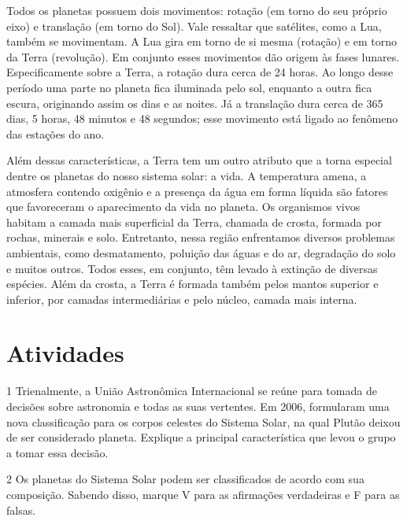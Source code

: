 {Todos os planetas possuem dois movimentos: rotação (em torno do seu
próprio eixo) e translação (em torno do Sol). Vale ressaltar que
satélites, como a Lua, também se movimentam. A Lua gira em torno de si
mesma (rotação) e em torno da Terra (revolução). Em conjunto esses
movimentos dão origem às fases lunares. Especificamente sobre a Terra, a
rotação dura cerca de 24 horas. Ao longo desse período uma parte no
planeta fica iluminada pelo sol, enquanto a outra fica escura,
originando assim os dias e as noites. Já a translação dura cerca de 365
dias, 5 horas, 48 minutos e 48 segundos; esse movimento está ligado ao fenômeno das estações do ano.

Além dessas características, a Terra tem um outro atributo que a torna
especial dentre os planetas do nosso sistema solar: a vida. A
temperatura amena, a atmosfera contendo oxigênio e a presença da água em
forma líquida são fatores que favoreceram o aparecimento da vida no
planeta. Os organismos vivos habitam a camada mais superficial da Terra,
chamada de crosta, formada por rochas, minerais e solo. Entretanto,
nessa região enfrentamos diversos problemas ambientais, como
desmatamento, poluição das águas e do ar, degradação do solo e muitos
outros. Todos esses, em conjunto, têm levado à extinção de diversas
espécies. Além da crosta, a Terra é formada também pelos mantos superior e
inferior, por camadas intermediárias e pelo núcleo, camada mais interna.}

\section{Atividades}

\num{1}  Trienalmente, a União Astronômica Internacional se reúne para tomada
  de decisões sobre astronomia e todas as suas vertentes. Em 2006,
  formularam uma nova classificação para os corpos celestes do Sistema
  Solar, na qual Plutão deixou de ser considerado planeta. Explique a
  principal característica que levou o grupo a tomar essa decisão.



\num{2} Os planetas do Sistema Solar podem ser classificados de acordo com sua
  composição. Sabendo disso, marque V para as afirmações verdadeiras e F para as falsas.


